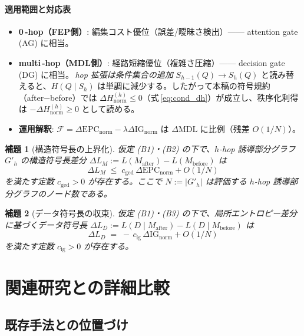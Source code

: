 \documentclass[ja=standard,xelatex]{bxjsarticle}
\newtheorem{lemma}{補題}[section]
\newcommand{\F}{\mathcal{F}}
\newcommand{\gednorm}{\Delta\mathrm{EPC}_{\mathrm{norm}}}
\newcommand{\ignorm}{\Delta\mathrm{IG}_{\mathrm{norm}}}
\begin{document}
\paragraph{適用範囲と対応表}
\begin{itemize}[leftmargin=1.6em]
  \item \textbf{0\,\mbox{-}hop（FEP側）}: 編集コスト優位（誤差/曖昧さ検出）—— attention gate (AG) に相当。
  \item \textbf{multi\,\mbox{-}hop（MDL側）}: 経路短縮優位（複雑さ圧縮）—— decision gate (DG) に相当。\,\emph{hop 拡張は条件集合の追加} $S_{h-1}(Q)\to S_h(Q)$ と読み替えると、$H(Q\mid S_h)$ は単調に減少する。したがって本稿の符号規約（after−before）では $\Delta H^{(h)}_{\mathrm{norm}}\le0$（式\,\ref{eq:cond_dh}）が成立し、秩序化利得は $-\Delta H^{(h)}_{\mathrm{norm}}\ge0$ として読める。
  \item \textbf{運用解釈}: $\F=\gednorm-\lambda\ignorm$ は $\Delta\mathrm{MDL}$ に比例（残差 $O(1/N)$）。
  \end{itemize}

\begin{lemma}[構造符号長の上界化]
\label{lem:structure_code_length}
仮定 (B1)・(B2) の下で、$h$-hop 誘導部分グラフ $G'_h$ の構造符号長差分 $\Delta L_M:=L(M_{\mathrm{after}})-L(M_{\mathrm{before}})$ は
\[
  \Delta L_M \;\le\; c_{\mathrm{ged}}\,\gednorm + O(1/N)
\]
を満たす定数 $c_{\mathrm{ged}}>0$ が存在する。ここで $N:=|G'_h|$ は評価する $h$-hop 誘導部分グラフのノード数である。
\end{lemma}

\begin{lemma}[データ符号長の収束]
\label{lem:data_code_length}
仮定 (B1)・(B3) の下で、局所エントロピー差分に基づくデータ符号長 $\Delta L_D:=L(D\mid M_{\mathrm{after}})-L(D\mid M_{\mathrm{before}})$ は
\[
  \Delta L_D \;=\; -\,c_{\mathrm{ig}}\,\ignorm + O(1/N)
\]
を満たす定数 $c_{\mathrm{ig}}>0$ が存在する。
\end{lemma}

\section{関連研究との詳細比較}

\subsection{既存手法との位置づけ}
\end{document}
